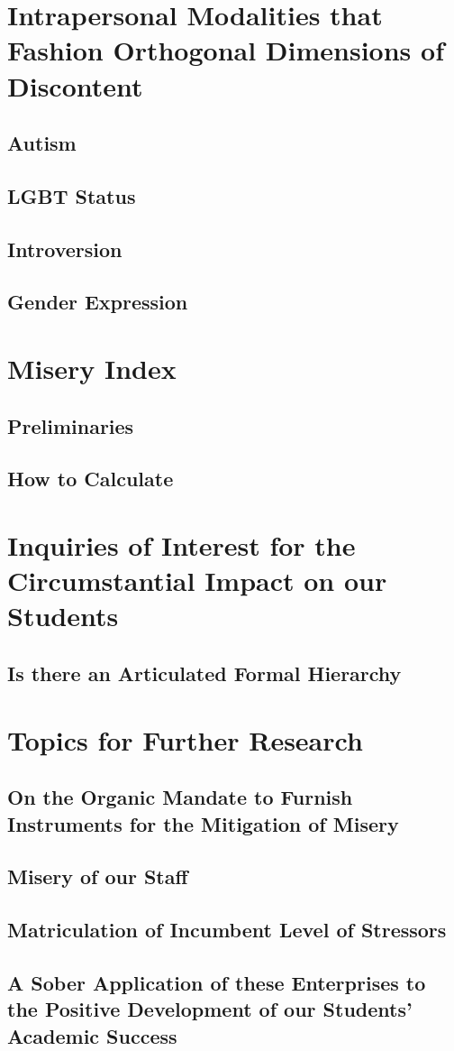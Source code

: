 \documentclass[UTF8]{article}
\begin{document}
	\section{Intrapersonal Modalities that Fashion Orthogonal Dimensions of Discontent}
	\subsection{Autism}
	\subsection{LGBT Status}
	\subsection{Introversion}
	\subsection{Gender Expression}

	\section{Misery Index}
	\subsection{Preliminaries}
	\subsection{How to Calculate}
	
	\section{Inquiries of Interest for the Circumstantial Impact on our Students}
	\subsection{Is there an Articulated Formal Hierarchy }
	
	\section{Topics for Further Research}
	\subsection{On the Organic Mandate to Furnish Instruments for the Mitigation of Misery}
	\subsection{Misery of our Staff}
	\subsection{Matriculation of Incumbent Level of Stressors}
	\subsection{A Sober Application of these Enterprises to the Positive Development of our Students' Academic Success}
	
\end{document}
